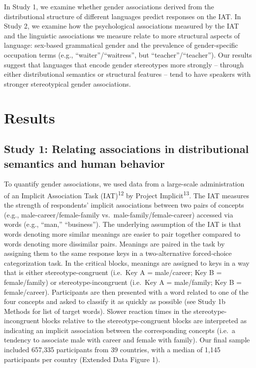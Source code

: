 \documentclass[11pt]{wlscirep}
\begin{document}
In Study 1, we examine whether gender associations derived from the distributional structure of different languages predict responses on the IAT. In Study 2, we examine how the psychological
associations measured by the IAT and the linguistic associations we measure relate
to more structural aspects of language: sex-based grammatical gender and
the prevalence of gender-specific occupation terms (e.g.,
\enquote{waiter}/\enquote{waitress}, but
\enquote{teacher}/\enquote{teacher}). Our results suggest that languages that encode gender stereotypes more strongly -- through either distributional semantics or structural features -- tend to have speakers with stronger stereotypical gender associations.


\section*{Results}
\subsection*{Study 1: Relating associations in distributional semantics and
human
behavior}\label{study-1-relating-gender-biases-in-distributional-semantics-and-human-behavior}

To quantify gender associations, we used data from a large-scale administration of an Implicit Association Task (IAT)\textsuperscript{12}  by Project Implicit\textsuperscript{13}. The IAT measures the strength of respondents' implicit associations between two pairs of concepts (e.g., male-career/female-family vs.~male-family/female-career) accessed via
words (e.g., \enquote{man,} \enquote{business}). The underlying
assumption of the IAT is that words denoting more similar meanings
are easier to pair together compared to words denoting more dissimilar pairs. Meanings are paired in the task by assigning them to the same response
keys in a two-alternative forced-choice categorization task. In the
critical blocks, meanings are assigned to keys in a way that
is either stereotype-congruent (i.e.~Key A = male/career; Key B =
female/family) or stereotype-incongruent (i.e.~Key A = male/family; Key B =
female/career). Participants are then presented with a word related to
one of the four concepts and asked to classify it as quickly as possible
(see Study 1b Methods for list of target words). Slower reaction times
in the stereotype-incongruent blocks relative to the stereotype-congruent blocks are
interpreted as indicating an implicit association between the
corresponding concepts (i.e.~a tendency to associate male with career and
female with family). Our final sample included 657,335 participants from 39 countries, with a
median of 1,145 participants per country (Extended Data Figure 1).
\end{document}
